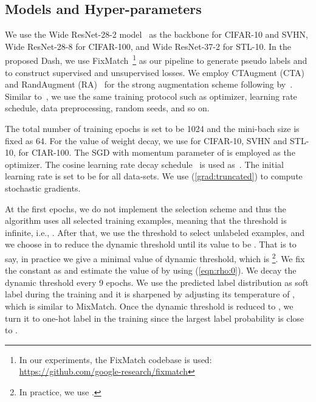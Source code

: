 \documentclass{article}
\def \Alg {Dash}
\begin{document}
\subsection{ Models and Hyper-parameters}
We use the Wide ResNet-28-2 model~\citep{zagoruyko2016wide} as the backbone for CIFAR-10 and SVHN, Wide ResNet-28-8 for CIFAR-100, and Wide ResNet-37-2 for STL-10. In the proposed \Alg, we use FixMatch~\footnote{In our experiments, the FixMatch codebase is used: \url{https://github.com/google-research/fixmatch}} as our pipeline to generate pseudo labels and to construct supervised and unsupervised losses. 
We employ CTAugment (CTA)~\citep{cubuk2019autoaugment} and RandAugment (RA)~\citep{cubuk2020randaugment} for the strong augmentation scheme following by~\citep{sohn2020fixmatch}. Similar to~\citep{sohn2020fixmatch}, we use the same training protocol such as optimizer, learning rate schedule, data preprocessing, random seeds, and so on. 


The total number of training epochs is set to be 1024 and the mini-bach size is fixed as 64. For the value of weight decay, we use  for CIFAR-10, SVHN and STL-10,  for CIAR-100. The SGD with momentum parameter of  is employed as the optimizer. The cosine learning rate decay schedule~\citep{loshchilov2016sgdr} is used as~\citep{sohn2020fixmatch}. The initial learning rate is set to be  for all data-sets. We use (\ref{grad:truncated}) to compute stochastic gradients. 

At the first  epochs, we do not implement the selection scheme and thus the algorithm uses all selected training examples, meaning that the threshold is infinite, i.e., . After that, we use the threshold to select unlabeled examples, and we choose  in  to reduce the dynamic threshold until its value to be . That is to say, in practice we give a minimal value of dynamic threshold, which is \footnote{In practice, we use .}. We fix the constant  as  and estimate the value of  by using (\ref{eqn:rho:0}). We decay the dynamic threshold every 9 epochs. We use the predicted label distribution as soft label during the training and it is sharpened by adjusting its temperature of , which is similar to MixMatch. Once the dynamic threshold is reduced to , we turn it to one-hot label in the training since the largest label probability is close to . 
\end{document}
